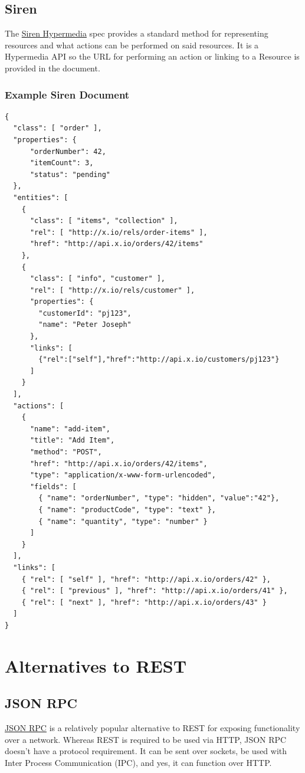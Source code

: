 \documentclass{book}
\begin{document}
\subsection{Siren}

The \href{http://sirenspec.org}{Siren Hypermedia} spec provides a standard method for representing resources and what actions can be performed on said resources. It is a Hypermedia API so the URL for performing an action or linking to a Resource is provided in the document.

\subsubsection{Example Siren Document}

\begin{verbatim}
{
  "class": [ "order" ],
  "properties": { 
      "orderNumber": 42, 
      "itemCount": 3,
      "status": "pending"
  },
  "entities": [
    { 
      "class": [ "items", "collection" ], 
      "rel": [ "http://x.io/rels/order-items" ], 
      "href": "http://api.x.io/orders/42/items"
    },
    {
      "class": [ "info", "customer" ],
      "rel": [ "http://x.io/rels/customer" ], 
      "properties": { 
        "customerId": "pj123",
        "name": "Peter Joseph"
      },
      "links": [
        {"rel":["self"],"href":"http://api.x.io/customers/pj123"}
      ]
    }
  ],
  "actions": [
    {
      "name": "add-item",
      "title": "Add Item",
      "method": "POST",
      "href": "http://api.x.io/orders/42/items",
      "type": "application/x-www-form-urlencoded",
      "fields": [
        { "name": "orderNumber", "type": "hidden", "value":"42"},
        { "name": "productCode", "type": "text" },
        { "name": "quantity", "type": "number" }
      ]
    }
  ],
  "links": [
    { "rel": [ "self" ], "href": "http://api.x.io/orders/42" },
    { "rel": [ "previous" ], "href": "http://api.x.io/orders/41" },
    { "rel": [ "next" ], "href": "http://api.x.io/orders/43" }
  ]
}
\end{verbatim}


\section{Alternatives to REST}

\subsection{JSON RPC}

\href{http://www.jsonrpc.org/specification}{JSON RPC} is a relatively popular alternative to REST for exposing functionality over a network. Whereas REST is required to be used via HTTP, JSON RPC doesn't have a protocol requirement. It can be sent over sockets, be used with Inter Process Communication (IPC), and yes, it can function over HTTP.
\end{document}
